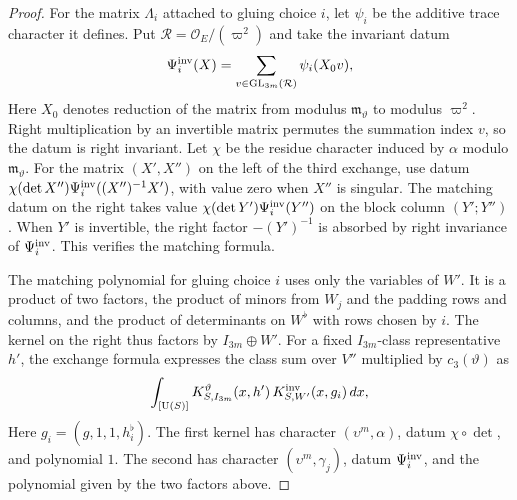 \begin{proof}
For the matrix $\Lambda_i$ attached to gluing choice $i$, let $\psi_i$ be the additive trace character it defines. Put $\mathcal R=\mathcal O_E/(\varpi^2)$ and take the invariant datum
\[
 \Psi_i^{\rm inv}(X)
   =\sum_{v\in\mathrm{GL}_{3m}(\mathcal R)}
       \psi_i(X_0v) ,
\]
Here $X_0$ denotes reduction of the matrix from modulus $\mathfrak m_\vartheta$ to modulus $\varpi^2$. Right multiplication by an invertible matrix permutes the summation index $v$, so the datum is right invariant. Let $\chi$ be the residue character induced by $\alpha$ modulo $\mathfrak m_\vartheta$. For the matrix $(X',X'')$ on the left of the third exchange, use datum $\chi(\det X'')\Psi_i^{\rm inv}((X'')^{-1}X')$, with value zero when $X''$ is singular. The matching datum on the right takes value $\chi(\det Y')\Psi_i^{\rm inv}(Y'')$ on the block column $(Y';Y'')$. When $Y'$ is invertible, the right factor $-(Y')^{-1}$ is absorbed by right invariance of $\Psi_i^{\rm inv}$. This verifies the matching formula.

The matching polynomial for gluing choice $i$ uses only the variables of $W'$. It is a product of two factors, the product of minors from $W_j$ and the padding rows and columns, and the product of determinants on $W^\flat$ with rows chosen by $i$. The kernel on the right thus factors by $I_{3m}\oplus W'$. For a fixed $I_{3m}$-class representative $h'$, the exchange formula expresses the class sum over $V''$ multiplied by $c_3(\vartheta)$ as
\[
 \int_{[\operatorname{U}(S)]}
  K_{S,I_{3m}}^{\vartheta}(x,h')\,
  K_{S,W'}^{\rm inv}(x,g_i)\,dx ,
\]
Here $g_i=(g,1,1,h_i^\flat)$. The first kernel has character $(\upsilon^m,\alpha)$, datum $\chi\circ\det$, and polynomial $1$. The second has character $(\upsilon^m,\gamma_j)$, datum $\Psi_i^{\rm inv}$, and the polynomial given by the two factors above.


\end{proof}
